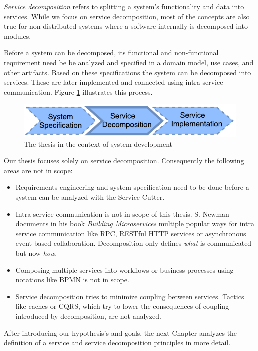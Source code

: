 \textit{Service decomposition} refers to splitting a system's functionality and data into services. While we focus on service decomposition, most of the concepts are also true for non-distributed systems where a software internally is decomposed into modules. 

Before a system can be decomposed, its functional and non-functional requirement need be be analyzed and specified in a domain model, use cases, and other artifacts. Based on these specifications the system can be decomposed into services. These are later implemented and connected using intra service communication. Figure \ref{fig:context} illustrates this process.

\begin{figure}[H]
	\begin{center}
		\includegraphics[scale=1.4]{diagrams/context.pdf}
	\end{center}
	\caption{The thesis in the context of system development}
	\label{fig:context}
\end{figure}

Our thesis focuses solely on service decomposition. Consequently the following areas are not in scope:

\begin{itemize}
	\item Requirements engineering and system specification need to be done before a system can be analyzed with the Service Cutter.
	\item Intra service communication is not in scope of this thesis. S. Newman documents in his book \textit{Building Microservices}\cite{newman2015building} multiple popular ways for intra service communication like \gls{RPC}, RESTful HTTP services or asynchronous event-based collaboration. Decomposition only defines \textit{what} is communicated but now \textit{how}. 
	\item Composing multiple services into workflows or business processes using notations like \gls{BPMN} is not in scope.
	\item Service decomposition tries to minimize coupling between services. Tactics like caches or \gls{CQRS}, which try to lower the consequences of coupling introduced by decomposition, are not analyzed. 
\end{itemize}

\bigskip

After introducing our hypothesis's and goals, the next Chapter analyzes the definition of a service and service decomposition principles in more detail. 

